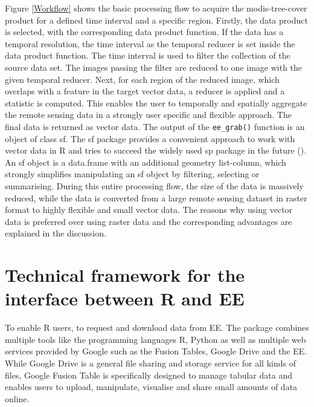 Figure \ref{Workflow} shows the basic processing flow to acquire the modis-tree-cover product for a defined time interval and a specific region. Firstly, the data product is selected, with the corresponding data product function. If the data has a temporal resolution, the time interval as the temporal reducer is set inside the data product function. The time interval is used to filter the collection of the source data set. The images passing the filter are reduced to one image with the given temporal reducer. Next, for each region of the reduced image, which overlaps with a feature in the target vector data, a reducer is applied and a statistic is computed. This enables the user to temporally and spatially aggregate the remote sensing data in a strongly user specific and flexible approach. The final data is returned as vector data.
The output of the \texttt{ee\_grab()} function is an object of class sf. The sf package provides a convenient approach to work with vector data in R and tries to succeed the widely used sp package in the future (\cite{sf}). An sf object is a data.frame with an additional geometry list-column, which strongly simplifies manipulating an sf object by filtering, selecting or summarising. 
During this entire processing flow, the size of the data is massively reduced, while the data is converted from a large remote sensing dataset in raster format to highly flexible and small vector data. The reasons why using vector data is preferred over using raster data and the corresponding advantages are explained in the discussion.

\section{Technical framework for the interface between R and EE}

To enable R users, to request and download data from EE. The package combines multiple tools like the programming languages R, Python as well as multiple web services provided by Google such as the Fusion Tables, Google Drive and the EE. While Google Drive is a general file sharing and storage service for all kinds of files, Google Fusion Table is specifically designed to manage tabular data and enables users to upload, manipulate, visualise and share small amounts of data online.

